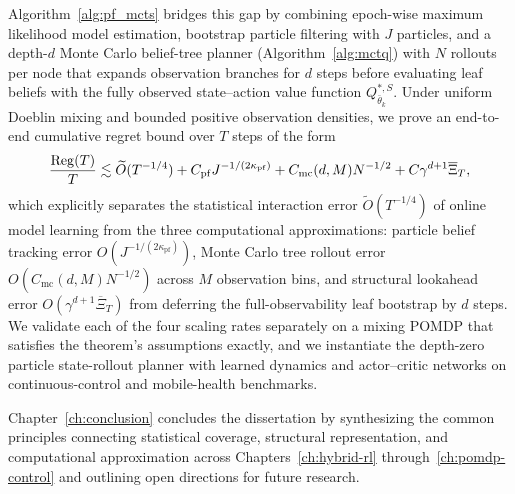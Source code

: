 \begin{aigenblock}
Algorithm~\ref{alg:pf_mcts} bridges this gap by combining epoch-wise maximum likelihood model estimation, bootstrap particle filtering with $J$ particles, and a depth-$d$ Monte Carlo belief-tree planner (Algorithm~\ref{alg:mctq}) with $N$ rollouts per node that expands observation branches for $d$ steps before evaluating leaf beliefs with the fully observed state--action value function $Q_{\bar{\theta}_k}^{*,S}$. Under uniform Doeblin mixing and bounded positive observation densities, we prove an end-to-end cumulative regret bound over $T$ steps of the form
\begin{equation}
\label{eq:intro-pomdp-regret}
\frac{\operatorname{Reg}(T)}{T} \lesssim \widetilde{O}(T^{-1/4}) + C_{\mathrm{pf}} J^{-1/(2\kappa_{\mathrm{pf}})} + C_{\mathrm{mc}}(d,M) N^{-1/2} + C \gamma^{d+1} \overline{\Xi}_T,
\end{equation}
which explicitly separates the statistical interaction error $\widetilde{O}(T^{-1/4})$ of online model learning from the three computational approximations: particle belief tracking error $O(J^{-1/(2\kappa_{\mathrm{pf}})})$, Monte Carlo tree rollout error $O(C_{\mathrm{mc}}(d,M) N^{-1/2})$ across $M$ observation bins, and structural lookahead error $O(\gamma^{d+1}\overline{\Xi}_T)$ from deferring the full-observability leaf bootstrap by $d$ steps. We validate each of the four scaling rates separately on a mixing POMDP that satisfies the theorem's assumptions exactly, and we instantiate the depth-zero particle state-rollout planner with learned dynamics and actor--critic networks on continuous-control and mobile-health benchmarks.

Chapter~\ref{ch:conclusion} concludes the dissertation by synthesizing the common principles connecting statistical coverage, structural representation, and computational approximation across Chapters~\ref{ch:hybrid-rl} through~\ref{ch:pomdp-control} and outlining open directions for future research.
\end{aigenblock}
